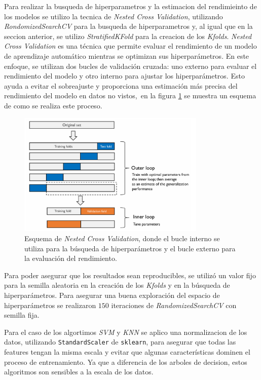 \documentclass[10pt,a4paper]{article}
\begin{document}
Para realizar la busqueda de hiperparametros y la estimacion del rendimieinto de los modelos se utilizo la tecnica de \textit{Nested Cross Validation}, utilizando \textit{RondomizedSearchCV} para la busqueda de hiperparametros y, al igual que en la seccion anterior,
se utilizo \textit{StratifiedKFold} para la creacion de los \textit{Kfolds}.
\textit{Nested Cross Validation} es una técnica que permite evaluar el rendimiento de un modelo de aprendizaje automático mientras se optimizan sus hiperparámetros. En este enfoque, se utilizan dos bucles de validación cruzada: uno externo para evaluar el rendimiento del modelo y otro interno para ajustar los hiperparámetros. Esto ayuda a evitar el sobreajuste
 y proporciona una estimación más precisa del rendimiento del modelo en datos no vistos,~en la figura \ref{fig:nested_cross_validation} se muestra un esquema de como se realiza este proceso.

\begin{figure}[H]
    \centering
    \includegraphics[width=0.8\textwidth]{Imagenes/nested-kfold-cv.png}
    \caption{Esquema de \textit{Nested Cross Validation}, donde el bucle interno se utiliza para la búsqueda de hiperparámetros y el bucle externo para la evaluación del rendimiento.}
    \label{fig:nested_cross_validation}
\end{figure}

Para poder asegurar que los resultados sean reproducibles, se utilizó un valor fijo para la semilla aleatoria en la creación de los \textit{Kfolds} 
y en la búsqueda de hiperparámetros. Para asegurar una buena exploración del espacio de hiperparámetros se realizaron $150$ iteraciones de \textit{RandomizedSearchCV}  con semilla fija.

Para el caso de los algortimos \textit{SVM} y \textit{KNN} se aplico una normalizacion de los datos, utilizando \texttt{StandardScaler} de \texttt{sklearn}, para asegurar que todas las features tengan la misma escala y evitar que algunas características dominen el proceso de entrenamiento. Ya que a diferencia
de los arboles de decision, estos algoritmos son sensibles a la escala de los datos.
\end{document}
